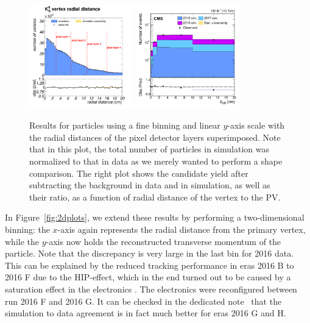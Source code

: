 \begin{figure}[h!]
    \centering
    \includegraphics[width=0.40\textwidth]{Figures/c6/efficiencies/2017E_detector}
    \includegraphics[width=0.40\textwidth]{Figures/paper/K_short_Displacement.pdf}
    \caption{Results for \PKzS particles using a fine binning and
      linear $y$-axis scale with the radial distances of the pixel
      detector layers superimposed. Note that in this plot, the total
      number of \PKzS particles in simulation was normalized to that
      in data as we merely wanted to perform a shape comparison.
      The right plot shows the \PKzS candidate yield after subtracting
      the background in data and in simulation, as well as their
      ratio, as a function of radial distance of the \PKzS vertex to
      the PV. \luka}
    \label{fig:2017_detector}
\end{figure}

In Figure~\ref{fig:2dplots}, we extend these results by performing a
two-dimensional binning: the $x$-axis again represents the radial
distance from the primary vertex, while the $y$-axis now holds the
reconstructed transverse momentum of the particle. 
Note that the discrepancy is very large in the last bin for 2016
data. This can be explained by the reduced tracking performance in
eras 2016 B to 2016 F due to the HIP-effect, which in the end turned
out to be caused by a saturation effect in the electronics
\cite{hipeffect}. The electronics were reconfigured between run 2016 F
and 2016 G. It can be checked in the dedicated note~\cite{AN-20-111_KshortStudy} that the simulation to data agreement is
in fact much better for eras 2016 G and H. 

